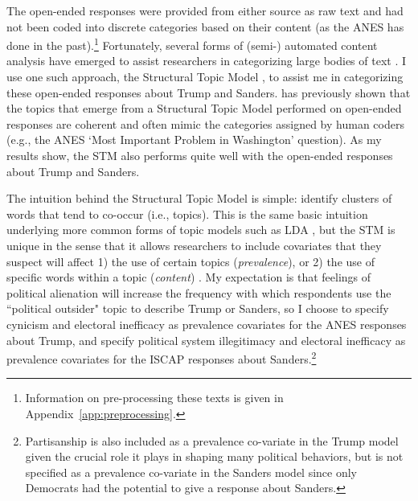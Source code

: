 \documentclass[12pt]{article}
\begin{document}
The open-ended responses were provided from either source as raw text and had not been coded into discrete categories based on their content (as the ANES has done in the past).\footnote{Information on pre-processing these texts is given in Appendix~\ref{app:preprocessing}.} Fortunately, several forms of (semi-) automated content analysis have emerged to assist researchers in categorizing large bodies of text \parencite{grimmer2013text}. I use one such approach, the Structural Topic Model \parencite{roberts2019stm}, to assist me in categorizing these open-ended responses about Trump and Sanders. \textcite{roberts2014structural} has previously shown that the topics that emerge from a Structural Topic Model performed on open-ended responses are coherent and often mimic the categories assigned by human coders (e.g., the ANES `Most Important Problem in Washington' question). As my results show, the STM also performs quite well with the open-ended responses about Trump and Sanders. 

The intuition behind the Structural Topic Model is simple: identify clusters of words that tend to co-occur (i.e., topics). This is the same basic intuition underlying more common forms of topic models such as LDA \parencite{Blei2003}, but the STM is unique in the sense that it allows researchers to include covariates that they suspect will affect 1) the use of certain topics (\textit{prevalence}), or 2) the use of specific words within a topic (\textit{content}) \parencite{roberts2014structural}. My expectation is that feelings of political alienation will increase the frequency with which respondents use the ``political outsider" topic to describe Trump or Sanders, so I choose to specify cynicism and electoral inefficacy as prevalence covariates for the ANES responses about Trump, and specify political system illegitimacy and electoral inefficacy as prevalence covariates for the ISCAP responses about Sanders.\footnote{Partisanship is also included as a prevalence co-variate in the Trump model given the crucial role it plays in shaping many political behaviors, but is not specified as a prevalence co-variate in the Sanders model since only Democrats had the potential to give a response about Sanders.}
\end{document}

